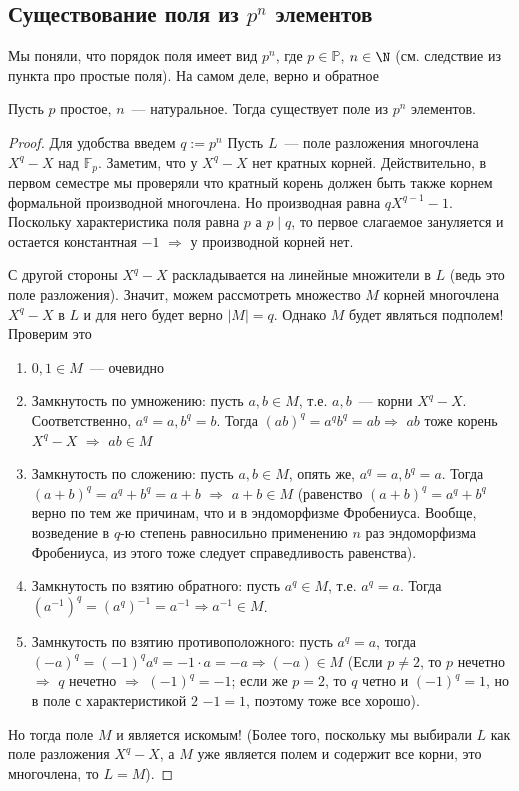 \subsection{Существование поля из $p^n$ элементов}
Мы поняли, что порядок поля имеет вид $p^n$, где $p\in\mathbb{P}$, $n\in \N$ (см. следствие из пункта про простые поля).
На самом деле, верно и обратное
\begin{theorem-non}
    Пусть $p$ простое, $n$~--- натуральное.
    Тогда существует поле из $p^n$ элементов.
\end{theorem-non}
\begin{proof}
    Для удобства введем $q := p^n$
    Пусть $L$~--- поле разложения многочлена $X^q-X$ над $\mathbb{F}_p$.
    Заметим, что у $X^q-X$ нет кратных корней.
    Действительно, в первом семестре мы проверяли что кратный корень должен быть также корнем формальной производной многочлена.
    Но производная равна $qX^{q-1}-1$.
    Поскольку характеристика поля равна $p$ а $p\mid q$, то первое слагаемое зануляется и остается константная $-1$ $\Rightarrow$ у производной корней нет.

    С другой стороны $X^q-X$ раскладывается на линейные множители в $L$ (ведь это поле разложения).
    Значит, можем рассмотреть множество $M$ корней многочлена $X^q-X$ в $L$ и для него будет верно $|M|=q$.
    Однако $M$ будет являться подполем!
    Проверим это
    \begin{enumerate}
        \item $0,1\in M$~--- очевидно
        \item Замкнутость по умножению: пусть $a, b\in M$, т.е. $a,b$~--- корни $X^q-X$.
        Соответственно, $a^q=a, b^q=b$.
        Тогда $(ab)^q=a^q b^q = ab \Rightarrow$ $ab$ тоже корень $X^q-X$ $\Rightarrow$ $ab\in M$
        \item Замкнутость по сложению: пусть $a, b\in M$, опять же, $a^q=a, b^q=a$.
        Тогда $(a+b)^q = a^q + b^q = a + b$ $\Rightarrow$ $a+b \in M$ (равенство $(a+b)^q = a^q+b^q$ верно по тем же причинам, что и в эндоморфизме Фробениуса. Вообще, возведение в $q$-ю степень равносильно применению $n$ раз эндоморфизма Фробениуса, из этого тоже следует справедливость равенства).
        \item Замкнутость по взятию обратного: пусть $a^q \in M$, т.е. $a^q=a$. Тогда $(a^{-1})^q = (a^q)^{-1}=a^{-1} \Rightarrow a^{-1} \in M$.
        \item Замнкутость по взятию противоположного: пусть $a^q=a$, тогда $(-a)^q = (-1)^q a^q = -1 \cdot a = -a \Rightarrow (-a) \in M$  (Если $p\neq 2$, то $p$ нечетно $\Rightarrow$ $q$ нечетно $\Rightarrow$ $(-1)^q = -1$; если же $p = 2$, то $q$ четно и $(-1)^q=1$, но в поле с характеристикой $2$ $-1=1$, поэтому тоже все хорошо).
    \end{enumerate}\medskip

    Но тогда поле $M$ и является искомым!
    (Более того, поскольку мы выбирали $L$ как поле разложения $X^q-X$, а $M$ уже является полем и содержит все корни, это многочлена, то $L=M$).
\end{proof}


